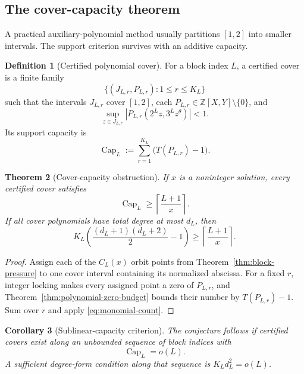 \documentclass[11pt,oneside]{article}
\newtheorem{theorem}{Theorem}[section]
\newtheorem{corollary}[theorem]{Corollary}
\theoremstyle{definition}
\newtheorem{definition}[theorem]{Definition}
\theoremstyle{remark}
\newcommand{\Z}{\mathbb Z}
\newcommand{\tht}{\theta}
\newcommand{\ceil}[1]{\left\lceil#1\right\rceil}
\begin{document}
\subsection{The cover-capacity theorem}

A practical auxiliary-polynomial method usually partitions $[1,2]$ into smaller intervals.  The
support criterion survives with an additive capacity.

\begin{definition}[Certified polynomial cover]
For a block index $L$, a certified cover is a finite family
\[
  \{(J_{L,r},P_{L,r}):1\le r\le K_L\}
\]
such that the intervals $J_{L,r}$ cover $[1,2]$, each $P_{L,r}\in\Z[X,Y]\setminus\{0\}$, and
\[
  \sup_{z\in J_{L,r}}|P_{L,r}(2^Lz,3^Lz^\tht)|<1.
\]
Its support capacity is
\begin{equation}
  \operatorname{Cap}_L:=\sum_{r=1}^{K_L}\bigl(T(P_{L,r})-1\bigr).
  \label{eq:capacity}
\end{equation}
\end{definition}

\begin{theorem}[Cover-capacity obstruction]
\label{thm:cover-capacity}
If $x$ is a noninteger solution, every certified cover satisfies
\begin{equation}
  \operatorname{Cap}_L\ge\ceil{\frac{L+1}{x}}.
  \label{eq:capacity-lower}
\end{equation}
If all cover polynomials have total degree at most $d_L$, then
\begin{equation}
  K_L\left(\frac{(d_L+1)(d_L+2)}2-1\right)
  \ge\ceil{\frac{L+1}{x}}.
  \label{eq:Kd2-lower}
\end{equation}
\end{theorem}

\begin{proof}
Assign each of the $C_L(x)$ orbit points from Theorem~\ref{thm:block-pressure} to one cover interval
containing its normalized abscissa.  For a fixed $r$, integer locking makes every assigned point a
zero of $P_{L,r}$, and Theorem~\ref{thm:polynomial-zero-budget} bounds their number by
$T(P_{L,r})-1$.  Sum over $r$ and apply \eqref{eq:monomial-count}.
\end{proof}

\begin{corollary}[Sublinear-capacity criterion]
\label{cor:sublinear-capacity}
The conjecture follows if certified covers exist along an unbounded sequence of block indices with
\[
  \operatorname{Cap}_L=o(L).
\]
A sufficient degree-form condition along that sequence is $K_Ld_L^2=o(L)$.
\end{corollary}
\end{document}
